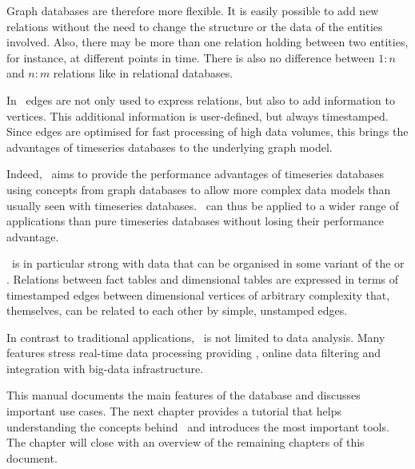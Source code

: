 \begin{minipage}{\textwidth}
\begin{center}
\end{center}
\end{minipage}

Graph databases are therefore more flexible.
It is easily possible to add new relations
without the need to change the structure or
the data of the entities involved. Also,
there may be more than one relation holding
between two entities, for instance, at
different points in time. There is also
no difference between $1:n$ and $n:m$ relations
like in relational databases. 

In \nowdb\ edges are not only
used to express relations,
but also to add information to vertices.
This additional information
is user-defined, but always
timestamped.
Since edges are optimised
for fast processing of high data volumes,
this brings the advantages of timeseries databases
to the underlying graph model.

Indeed, \nowdb\ aims to provide the
performance advantages of timeseries databases
using concepts from graph databases
to allow more complex data models
than usually seen with timeseries databases.
\nowdb\ can thus be applied to a wider
range of applications than pure
timeseries databases without losing
their performance advantage.

\nowdb\ is in particular strong with
data that can be organised in some variant of the
 or . Relations between
fact tables and dimensional tables
are expressed in terms of
timestamped edges
between dimensional vertices of
arbitrary complexity that, themselves, 
can be related to each other by
simple, unstamped edges.

In contrast to traditional
 applications,
\nowdb\ is not limited to data analysis.
Many features stress real-time data
processing providing ,
online data filtering and integration with big-data
infrastructure.

This manual documents the main features
of the database and discusses important
use cases. The next chapter provides
a  tutorial that helps
understanding the concepts behind \nowdb\
and introduces the most important tools.
The chapter will close
with an overview of the remaining
chapters of this document.


